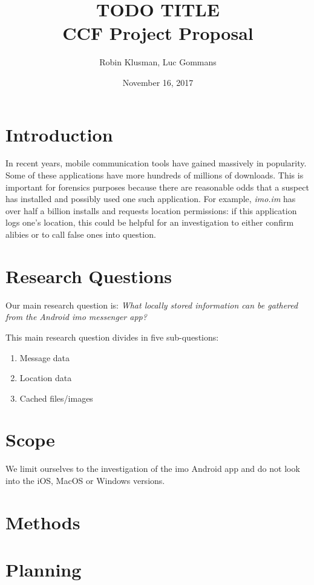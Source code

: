 \documentclass{article}
\title{TODO TITLE \\
	\vspace{0.3cm}
	{\large CCF Project Proposal}
}
\date{November 16, 2017}
\author{Robin Klusman, Luc Gommans}
\begin{document}
\maketitle

\section{Introduction}

In recent years, mobile communication tools have gained massively in
popularity. Some of these applications have more hundreds of millions of
downloads. This is important for forensics purposes because there are
reasonable odds that a suspect has installed and possibly used one such
application. For example, {\it imo.im} has over half a billion installs and
requests location permissions: if this application logs one's location, this
could be helpful for an investigation to either confirm alibies or to call
false ones into question.


\section{Research Questions}

Our main research question is:
{\it What locally stored information can be gathered from the Android imo messenger app?}

\vspace{0.5cm}

This main research question divides in five sub-questions:

\begin{enumerate}
	\item Message data
	\item Location data
	\item Cached files/images
\end{enumerate}


\section{Scope}

We limit ourselves to the investigation of the imo Android app and do not look
into the iOS, MacOS or Windows versions.  


\section{Methods}




\section{Planning}
\end{document}
